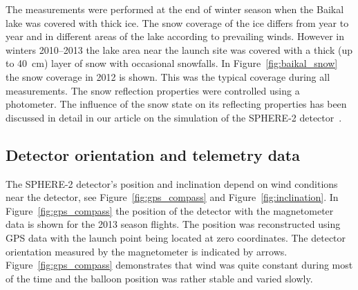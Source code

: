 \documentclass[universe,article,submit,moreauthors,pdftex]{Definitions/mdpi}
\begin{document}
The measurements were performed at the end of winter season when the Baikal lake was covered with thick ice. The snow coverage of the ice differs from year to year and in different areas of the lake according to prevailing winds. However in winters 2010--2013 the lake area near the launch site was covered with a thick (up to 40~cm) layer of snow with occasional snowfalls. In Figure~\ref{fig:baikal_snow} the snow coverage in 2012 is shown. This was the typical coverage during all measurements. The snow reflection properties were controlled using a photometer. The influence of the snow state on its reflecting properties has been discussed in detail in our article on the simulation of the SPHERE-2 detector~\cite{Ant19}.



\subsection{Detector orientation and telemetry data}
\label{sect:telemetrydata}

The \mbox{SPHERE-2} detector's position and inclination depend on wind conditions near the detector, see Figure~\ref{fig:gps_compass} and Figure~\ref{fig:inclination}. In Figure~\ref{fig:gps_compass} the position of the detector with the magnetometer data is shown for the 2013 season  flights. The position was reconstructed using GPS data with the launch point being located at zero coordinates. The detector orientation measured by the magnetometer is indicated by arrows. Figure~\ref{fig:gps_compass} demonstrates that wind was quite constant during most of the time and the balloon position was rather stable and varied slowly.  
\end{document}
